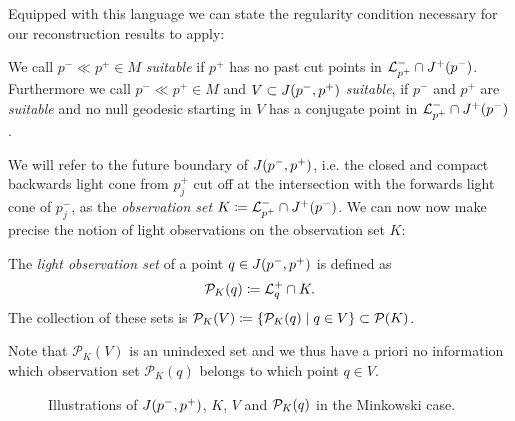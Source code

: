 Equipped with this language we can state the regularity condition necessary for our reconstruction results to apply:
\begin{definition}[Suitable]
    We call $p^-\ll p^+\in M$  \emph{suitable} if $p^+$ has no past cut points in ${\mathcal{L}}^-_{p^+}\cap J^+(p^-)$. Furthermore we call $p^-\ll p^+\in M$ and $V\subset J(p^-,p^+)$ \emph{suitable}, if $p^-$ and $p^+$ are \emph{suitable} and no null geodesic starting in $V$ has a conjugate point in ${\mathcal{L}}^-_{p^+}\cap J^+(p^-)$.
\end{definition}
We will refer to the future boundary of $J(p^-,p^+)$, i.e. the closed and compact backwards light cone from $p_j^+$ cut off at the intersection with the forwards light cone of $p_j^-$, as the \emph{observation set} $K\coloneqq {\mathcal{L}}^-_{p^+}\cap J^+(p^-)$. We can now now make precise the notion of light observations on the observation set $K$:
\begin{definition}
    The \emph{light observation set} of a point $q\in J(p^-,p^+)$ is defined as
    \[
    {\mathcal{P}}_K(q) \coloneqq {\mathcal{L}}^+_q \cap K.
    \]
    The collection of these sets is ${\mathcal{P}}_K(V)\coloneqq\{\mathcal{P}_K(q)\mid q\in V\}\subset {\mathcal{P}}(K)$.
\end{definition}
Note that $\mathcal{P}_K(V)$ is an unindexed set and we thus have a priori no information which observation set $\mathcal{P}_K(q)$ belongs to which point $q\in V$.

\begin{figure}
    \centering
    \hspace*{10pt}
    \caption{Illustrations of $J(p^-,p^+)$, $K$, $V$ and ${\mathcal{P}}_K(q)$ in the Minkowski case.}
    \label{fig:intro}
\end{figure}

